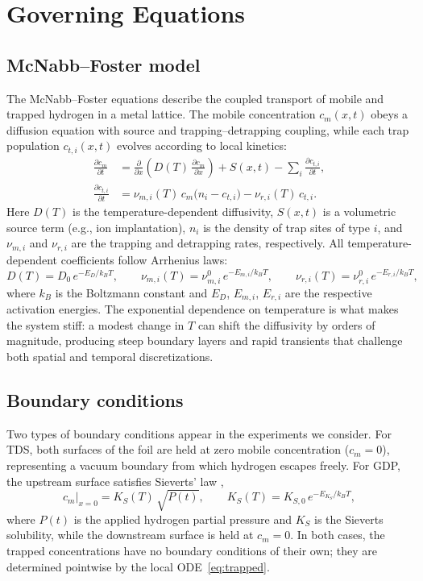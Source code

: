 \section{Governing Equations}\label{sec:governing}

\subsection{McNabb--Foster model}

The McNabb--Foster equations \cite{mcnabb1963} describe the coupled transport of mobile and trapped hydrogen in a metal lattice. The mobile concentration $c_m(x,t)$ obeys a diffusion equation with source and trapping--detrapping coupling, while each trap population $c_{t,i}(x,t)$ evolves according to local kinetics:
\begin{align}
  \frac{\partial c_m}{\partial t}
    &= \frac{\partial}{\partial x}\!\left(D(T)\,\frac{\partial c_m}{\partial x}\right)
       + S(x,t)
       - \sum_{i} \frac{\partial c_{t,i}}{\partial t},
  \label{eq:mobile} \\[4pt]
  \frac{\partial c_{t,i}}{\partial t}
    &= \nu_{m,i}(T)\,c_m\bigl(n_i - c_{t,i}\bigr)
       - \nu_{r,i}(T)\,c_{t,i}.
  \label{eq:trapped}
\end{align}
Here $D(T)$ is the temperature-dependent diffusivity, $S(x,t)$ is a volumetric source term (e.g., ion implantation), $n_i$ is the density of trap sites of type $i$, and $\nu_{m,i}$ and $\nu_{r,i}$ are the trapping and detrapping rates, respectively. All temperature-dependent coefficients follow Arrhenius laws:
\begin{equation}\label{eq:arrhenius}
  D(T) = D_0\,e^{-E_D/k_B T}, \qquad
  \nu_{m,i}(T) = \nu_{m,i}^0\,e^{-E_{m,i}/k_B T}, \qquad
  \nu_{r,i}(T) = \nu_{r,i}^0\,e^{-E_{r,i}/k_B T},
\end{equation}
where $k_B$ is the Boltzmann constant and $E_D$, $E_{m,i}$, $E_{r,i}$ are the respective activation energies. The exponential dependence on temperature is what makes the system stiff: a modest change in $T$ can shift the diffusivity by orders of magnitude, producing steep boundary layers and rapid transients that challenge both spatial and temporal discretizations.

\subsection{Boundary conditions}

Two types of boundary conditions appear in the experiments we consider. For TDS, both surfaces of the foil are held at zero mobile concentration ($c_m = 0$), representing a vacuum boundary from which hydrogen escapes freely. For GDP, the upstream surface satisfies Sieverts' law \cite{sieverts1929},
\begin{equation}\label{eq:sieverts}
  c_m\big|_{x=0} = K_S(T)\,\sqrt{P(t)},
  \qquad K_S(T) = K_{S,0}\,e^{-E_{K_S}/k_B T},
\end{equation}
where $P(t)$ is the applied hydrogen partial pressure and $K_S$ is the Sieverts solubility, while the downstream surface is held at $c_m = 0$. In both cases, the trapped concentrations have no boundary conditions of their own; they are determined pointwise by the local ODE~\eqref{eq:trapped}.

